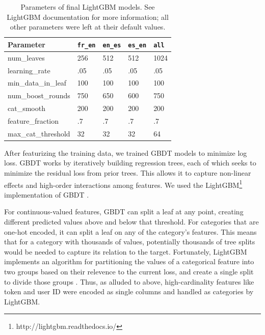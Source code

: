 \documentclass[11pt,a4paper]{article}
\begin{document}
\begin{table}[t!]
\small
\begin{center}
\begin{tabular}{|l|llll|}
  \hline \bf Parameter & {\tt fr\_en} & {\tt en\_es} & {\tt es\_en} & {\tt all} \\ \hline
  num\_leaves & 256 & 512 & 512 & 1024 \\
  learning\_rate & .05 & .05 & .05 & .05 \\
  min\_data\_in\_leaf & 100 & 100 & 100 & 100 \\
  num\_boost\_rounds & 750 & 650 & 600 & 750 \\
  cat\_smooth & 200 & 200 & 200& 200 \\
  feature\_fraction & .7 & .7 & .7 & .7 \\
  max\_cat\_threshold & 32 & 32 & 32& 64 \\
\hline
\end{tabular}
\end{center}
\caption{\label{lightgbm-params} Parameters of final LightGBM models. See
  LightGBM documentation for more information; all other parameters were left at
their default values.}
\end{table}

After featurizing the training data, we trained GBDT models to minimize log loss. GBDT works by
iteratively building regression trees, each of which seeks to minimize the
residual loss from prior trees. This allows it to capture non-linear effects
and high-order interactions among features. We used the LightGBM\footnote{http://lightgbm.readthedocs.io/} implementation
of GBDT \cite{ke2017lightgbm}.

For continuous-valued features, GBDT can split a leaf at any point, creating
different predicted values above and below that threshold. For categories that
are one-hot encoded, it can split a leaf on any of the category's features. This
means that for a category with thousands of values, potentially thousands of
tree splits would be needed to capture its relation to the target. Fortunately,
LightGBM implements an algorithm for partitioning the values of a categorical
feature into two groups based on their relevence to the current loss, and create
a single split to divide those groups \cite{fisher1958grouping}. Thus, as
alluded to above, high-cardinality features like token and user ID were encoded as
single columns and handled as categories by LightGBM.
\end{document}
